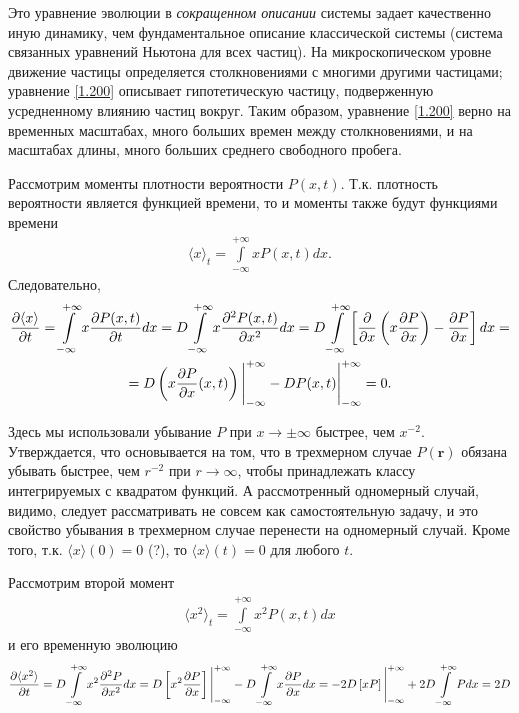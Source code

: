 \documentclass[14pt]{extarticle}
\newcommand{\vr}{\mathbf{r}}
\newcommand{\lb}{\left(}
\newcommand{\rb}{\right)}
\newcommand{\intty}{\int\limits_{-\infty}^{+\infty}}
\begin{document}
Это уравнение эволюции в \textit{сокращенном описании} системы задает качественно иную динамику, чем фундаментальное описание классической системы (система связанных уравнений Ньютона для всех частиц). На микроскопическом уровне движение частицы определяется столкновениями с многими другими частицами; уравнение \eqref{1.200} описывает гипотетическую частицу, подверженную усредненному влиянию частиц вокруг. Таким образом, уравнение \eqref{1.200} верно на временных масштабах, много больших времен между столкновениями, и на масштабах длины, много больших среднего свободного пробега. \par
	Рассмотрим моменты плотности вероятности $P(x, t)$. Т.к. плотность вероятности является функцией времени, то и моменты также будут функциями времени
\begin{gather}
	\langle x \rangle_t = \int\limits_{-\infty}^{+\infty} x P(x, t) dx. \label{1.201}
\end{gather}
Следовательно,
\begin{gather}
	\frac{\partial \langle x \rangle}{\partial t} = \intty x \frac{\partial P(x, t)}{\partial t} dx = D \intty x \frac{\partial^2 P(x, t)}{\partial x^2} dx = D \intty \left[ \frac{\partial}{\partial x} \lb x \frac{\partial P}{\partial x} \rb - \frac{\partial P}{\partial x} \right] dx = \notag \\
	= D \lb x \frac{\partial P}{\partial x}(x, t) \rb \Bigg{|}_{-\infty}^{+\infty} - D P(x, t) \Bigg{|}_{-\infty}^{+\infty} = 0. \label{1.203} 
\end{gather}

Здесь мы использовали убывание $P$ при $x \rightarrow \pm \infty$ быстрее, чем $x^{-2}$. Утверждается, что основывается на том, что в трехмерном случае $P(\vr)$ обязана убывать быстрее, чем $r^{-2}$ при $r \rightarrow \infty$, чтобы принадлежать классу интегрируемых с квадратом функций. А рассмотренный одномерный случай, видимо, следует рассматривать не совсем как самостоятельную задачу, и это свойство убывания в трехмерном случае перенести на одномерный случай. Кроме того, т.к. $\langle x \rangle(0) = 0$ (?), то $\langle x \rangle(t) = 0$ для любого $t$.

Рассмотрим второй момент
\begin{gather}
	\langle x^2 \rangle_t = \intty x^2 P(x, t) dx
\end{gather}
и его временную эволюцию
\begin{gather}
		\frac{\partial \langle x^2 \rangle}{\partial t} = D \intty x^2 \frac{\partial^2 P}{\partial x^2} dx = D \left[ x^2 \frac{\partial P}{\partial x} \right] \Bigg{|}_{-\infty}^{+\infty} - D \intty x \frac{\partial P}{\partial x} dx  = -2D \left[ x P \right] \Bigg{|}_{-\infty}^{+\infty} + 2D \intty P dx = 2D \label{1.206}
\end{gather}
\end{document}
